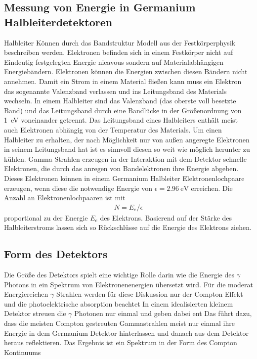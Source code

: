 \subsection{Messung von Energie in Germanium Halbleiterdetektoren \cite{book:gil}}
Halbleiter Können durch das Bandstruktur Modell aus der Festkörperphysik beschreiben werden.
Elektronen befinden sich in einem Festkörper nicht auf Eindeutig festgelegten Energie nieavous sondern auf
Materialabhängigen Energiebändern.
Elektronen können die Energien zwischen diesen Bändern nicht annehmen.
Damit ein Strom in einem Material fließen kann muss ein Elektron das sogenannte Valenzband verlassen und
ins Leitungsband des Materials wechseln.
In einem Halbleiter sind das Valenzband (das oberste voll besetzte Band) und das Leitungsband durch eine
Bandlücke in der Größenordnung von \qty{1}{\eV} voneinander getrennt.
Das Leitungsband eines Halbleiters enthält meist auch Elektronen abhängig von der Temperatur des Materials.
Um einen Halbleiter zu erhalten, der nach Möglichkeit nur von außen angeregte Elektronen in seinem Leitungsband hat
ist es sinnvoll diesen so weit wie möglich herunter zu kühlen.
Gamma Strahlen  erzeugen in der Interaktion mit dem Detektor schnelle Elektronen, die durch das anregen
von Bandelektronen ihre Energie abgeben.
Dieses Elektronen können in einem Germanium Halbleiter Elektronenlochpaare erzeugen, wenn diese die notwendige Energie von
$\epsilon = \qty{2.96}{\eV}$ erreichen.
Die Anzahl an Elektronenlochpaaren ist mit
\begin{align}
	N = E_e / \epsilon
\end{align}
proportional zu der Energie $E_e$ des Elektrons.
Basierend auf der Stärke des Halbleiterstroms lassen sich so Rückschlüsse auf die Energie des Elektrons ziehen.

\subsection{Form des Detektors \cite[vgl][Kap. 2.4]{book:gil}}
Die Größe des Detektors spielt eine wichtige Rolle darin wie die Energie des $\gamma$ Photons in ein
Spektrum von Elektronenenergien übersetzt wird.
Für die moderat Energiereichen $\gamma$ Strahlen werden für diese Diskussion nur der Compton Effekt und
die photoelektrische absorption beachtet
In einem idealisierten kleinem Detektor streuen die $\gamma$ Photonen nur einmal und geben dabei ent
Das führt dazu, dass die meisten Compton gestreuten Gammastrahlen meist nur einmal ihre Energie in dem
Germanium Detektor hinterlassen und danach aus dem Detektor heraus reflektieren.
Das Ergebnis ist ein Spektrum in der Form des Compton Kontinuums



